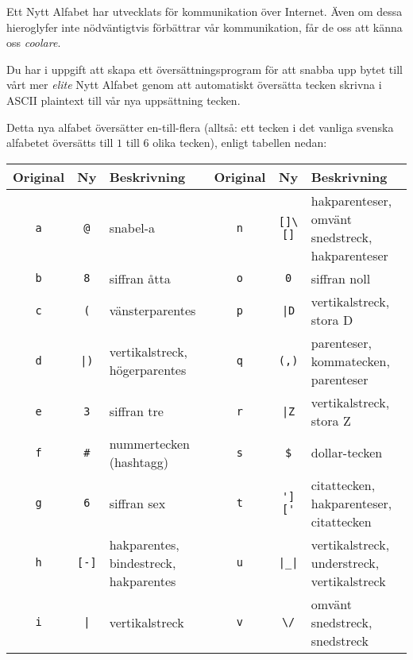 
Ett Nytt Alfabet har utvecklats för kommunikation över Internet. Även om dessa hieroglyfer inte nödväntigtvis 
förbättrar vår kommunikation, får de oss att känna oss \emph{coolare}.

Du har i uppgift att skapa ett översättningsprogram för att snabba upp bytet till vårt mer \emph{elite}
Nytt Alfabet genom att automatiskt översätta tecken skrivna i ASCII plaintext till vår nya uppsättning tecken.

Detta nya alfabet översätter en-till-flera (alltså: ett tecken i det vanliga
svenska alfabetet översätts till $1$ till $6$ olika tecken), enligt tabellen
nedan:

\begin{center}
    \begin{tabular}{|c|c|l||c|c|l|}
        \hline
        Original & Ny & Beskrivning & Original & Ny & Beskrivning\\
        \hline
        \verb+a+ & \verb+@+         & snabel-a                                &  \verb+n+ & \verb+[]\[]+     & hakparenteser, omvänt snedstreck, hakparenteser\\
        \verb+b+ & \verb+8+         & siffran åtta                               &  \verb+o+ & \verb+0+         & siffran noll \\
        \verb+c+ & \verb+(+         & vänsterparentes &  \verb+p+ & \verb+|D+        & vertikalstreck, stora D\\
        \verb+d+ & \verb+|)+        & vertikalstreck, högerparentes                    &  \verb+q+ & \verb+(,)+       & parenteser, kommatecken, parenteser \\
        \verb+e+ & \verb+3+         & siffran tre &  \verb+r+ & \verb+|Z+        & vertikalstreck, stora Z \\
        \verb+f+ & \verb+#+         & nummertecken (hashtagg)                        &  \verb+s+ & \verb+$+         & dollar-tecken\\
        \verb+g+ & \verb+6+         & siffran sex                                 &  \verb+t+ & \verb+']['+      & citattecken, hakparenteser, citattecken \\
        \verb+h+ & \verb+[-]+       & hakparentes, bindestreck, hakparentes &  \verb+u+ & \verb+|_|+       & vertikalstreck, understreck, vertikalstreck\\
        \verb+i+ & \verb+|+         & vertikalstreck                                       &  \verb+v+ & \verb+\/+        & omvänt snedstreck, snedstreck \\

\end{tabular}
\end{center}
